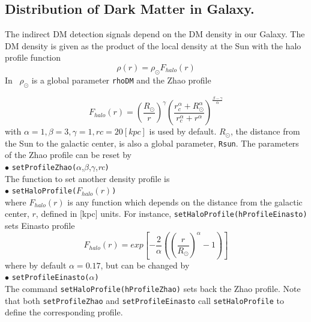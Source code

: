 \documentclass[12pt,a4paper]{article}
\begin{document}
\subsection{Distribution of Dark Matter  in Galaxy.}
The indirect DM detection signals depend on the DM density in our Galaxy.
The DM density is given as the product of the local density at the Sun with the halo profile function 
\begin{equation}
\rho(r)=\rho_\odot F_{halo}(r)
\end{equation}
In \micro\ $\rho_\odot$ is a global parameter {\tt rhoDM} and  the Zhao profile~\cite{Zhao:1995cp}

\begin{equation}
\label{rho}
F_{halo}(r)=\left(\frac{ R_\odot}{r}\right)^{\gamma}
\left(\frac{r_c^{\alpha}+ R_\odot^{\alpha}}
{r_c^{\alpha}+r^{\alpha}}\right)^{\frac{\beta -\gamma}{\alpha}}
\end{equation}
with   $\alpha=1,\beta=3,\gamma=1, rc=20[kpc]$ is used by
default. $R_\odot$, the distance from the Sun to the galactic center,  is also a global parameter, {\tt Rsun}. The parameters of the Zhao profile  can be reset by\\ 
\noindent
$\bullet$ \verb|setProfileZhao(|$\alpha$,$\beta$,$\gamma$,{\it rc}\verb|)|\\
The function to set another  density profile is\\ 
\noindent
$\bullet$ \verb|setHaloProfile(|$F_{halo}(r)$\verb|)|\\
where $F_{halo}(r)$ is any function which depends on the distance from the galactic center,  $r$,
 defined   in [kpc] units.
For instance, \verb|setHaloProfile(hProfileEinasto)|  sets Einasto profile\\
$$
F_{halo}(r)=exp\left[-\frac{2}{\alpha}\left(\left(\frac{r}{R_\odot}\right)^{\alpha}-1\right)\right]
$$
where by default $\alpha=0.17$,   but can be changed by \\ 
\noindent
$\bullet$ \verb|setProfileEinasto(|$\alpha$\verb|)| \\
The command \verb|setHaloProfile(hProfileZhao)| sets back the Zhao profile. Note
that both {\tt setProfileZhao} and {\tt setProfileEinasto} call
{\tt setHaloProfile} to define the corresponding profile. 
\end{document}
